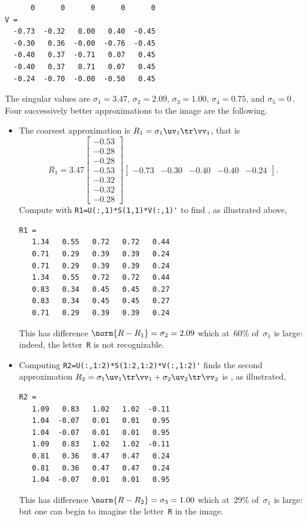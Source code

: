 \begin{example}
\begin{solution}
\begin{verbatim}
      0      0      0      0      0
V =
  -0.73  -0.32   0.00   0.40  -0.45
  -0.30   0.36  -0.00  -0.76  -0.45
  -0.40   0.37  -0.71   0.07   0.45
  -0.40   0.37   0.71   0.07   0.45
  -0.24  -0.70  -0.00  -0.50   0.45
\end{verbatim}
\setbox\ajrqrbox\hbox{}%
\marginajrbox%
The singular values are \(\sigma_1=3.47\), \(\sigma_2=2.09\), \(\sigma_3=1.00\), \(\sigma_4=0.75\), and \(\sigma_5=0\)\,.
Four successively better approximations to the image are the following.
\begin{itemize}
\item  
\begin{figbox}{}%
The coarsest approximation is \(R_1=\sigma_1\uv_1\tr\vv_1\), that is
{\small\begin{equation*}
R_1=3.47
\begin{bmatrix} -0.53\\-0.28\\-0.28\\-0.53\\-0.32\\-0.32\\-0.28 \end{bmatrix}
\begin{bmatrix} -0.73&-0.30&-0.40&-0.40&-0.24 \end{bmatrix}.
\end{equation*}}%
Compute with \verb|R1=U(:,1)*S(1,1)*V(:,1)'| to find \twodp, as illustrated above,
\end{figbox}
\begin{verbatim}
R1 =
   1.34   0.55   0.72   0.72   0.44
   0.71   0.29   0.39   0.39   0.24
   0.71   0.29   0.39   0.39   0.24
   1.34   0.55   0.72   0.72   0.44
   0.83   0.34   0.45   0.45   0.27
   0.83   0.34   0.45   0.45   0.27
   0.71   0.29   0.39   0.39   0.24
\end{verbatim}
This has difference \(\norm{R-R_1}=\sigma_2=2.09\) which at~60\% of~\(\sigma_1\) is large: indeed, the letter~\verb|R| is not recognizable.

\item 
\begin{figbox}{}%
Computing \verb|R2=U(:,1:2)*S(1:2,1:2)*V(:,1:2)'| finds the second approximation \(R_2=\sigma_1\uv_1\tr\vv_1+\sigma_2\uv_2\tr\vv_2\)
is \twodp, as illustrated,
\end{figbox}
\begin{verbatim}
R2 =
   1.09   0.83   1.02   1.02  -0.11
   1.04  -0.07   0.01   0.01   0.95
   1.04  -0.07   0.01   0.01   0.95
   1.09   0.83   1.02   1.02  -0.11
   0.81   0.36   0.47   0.47   0.24
   0.81   0.36   0.47   0.47   0.24
   1.04  -0.07   0.01   0.01   0.95
\end{verbatim}
This has difference \(\norm{R-R_2}=\sigma_3=1.00\) which at~29\% of~\(\sigma_1\) is large: but one can begin to imagine the letter~\verb|R| in the image.


\end{itemize}
\end{solution}
\end{example}
